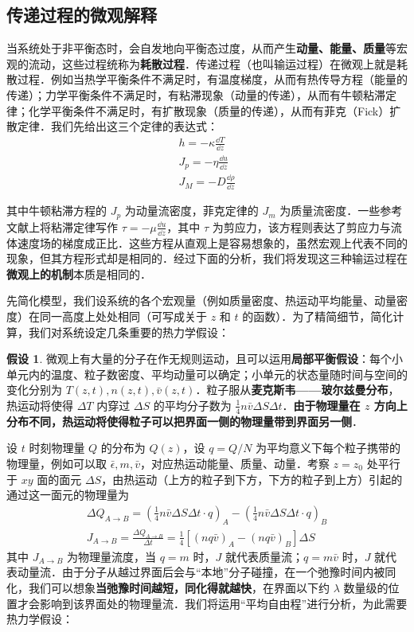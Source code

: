 \subsection{传递过程的微观解释}
当系统处于非平衡态时，会自发地向平衡态过度，从而产生\textbf{动量、能量、质量}等宏观的流动，这些过程统称为\textbf{耗散过程}．传递过程（也叫输运过程）在微观上就是耗散过程．例如当热学平衡条件不满足时，有温度梯度，从而有热传导方程（能量的传递）；力学平衡条件不满足时，有粘滞现象（动量的传递），从而有牛顿粘滞定律；化学平衡条件不满足时，有扩散现象（质量的传递），从而有菲克（Fick）扩散定律．我们先给出这三个定律的表达式：
\begin{align}
h=-\kappa \frac{\dd T}{\dd z}\\
J_p=-\eta \frac{\dd u}{\dd z}\\
J_M=-D\frac{\dd \rho}{\dd z}
\end{align}

其中牛顿粘滞方程的 $J_p$ 为动量流密度，菲克定律的 $J_m$ 为质量流密度．一些参考文献上将粘滞定律写作 $\tau = -\mu \frac{\dd u}{\dd z}$，其中 $\tau$ 为剪应力，该方程则表达了剪应力与流体速度场的梯度成正比．这些方程从直观上是容易想象的，虽然宏观上代表不同的现象，但其方程形式却是相同的．经过下面的分析，我们将发现这三种输运过程在\textbf{微观上的机制}本质是相同的．

先简化模型，我们设系统的各个宏观量（例如质量密度、热运动平均能量、动量密度）在同一高度上处处相同（可写成关于 $z$ 和 $t$ 的函数）．为了精简细节，简化计算，我们对系统设定几条重要的热力学假设：

\textbf{假设 1}. 微观上有大量的分子在作无规则运动，且可以运用\textbf{局部平衡假设}：每个小单元内的温度、粒子数密度、平均动量可以确定；小单元的状态量随时间与空间的变化分别为 $T(z,t),n(z,t),\bar v(z,t)$．粒子服从\textbf{麦克斯韦——玻尔兹曼分布}，热运动将使得 $\Delta T$ 内穿过 $\Delta S$ 的平均分子数为 $\frac{1}{4}n\bar v \Delta S\Delta t$．\textbf{由于物理量在 $z$ 方向上分布不同，热运动将使得粒子可以把界面一侧的物理量带到界面另一侧}．

设 $t$ 时刻物理量 $Q$ 的分布为 $Q(z)$，设 $q=Q/N$ 为平均意义下每个粒子携带的物理量，例如可以取 $\bar \epsilon,m,\bar v$，对应热运动能量、质量、动量．考察 $z=z_0$ 处平行于 $xy$ 面的面元 $\Delta S$，由热运动（上方的粒子到下方，下方的粒子到上方）引起的通过这一面元的物理量为
\begin{align}
\Delta Q_{A\rightarrow B}=(\frac{1}{4}n\bar v \Delta S\Delta t\cdot q)_A-(\frac{1}{4}n\bar v \Delta S\Delta t\cdot q)_B
\\
J_{A\rightarrow B}=\frac{\Delta Q_{A\rightarrow B}}{\Delta t}=\frac{1}{4}[(nq\bar v)_A-(nq\bar v)_B]\Delta S
\end{align}
其中 $J_{A\rightarrow B}$ 为物理量流度，当 $q=m$ 时，$J$ 就代表质量流；$q=m\bar v$ 时，$J$ 就代表动量流．由于分子从越过界面后会与“本地”分子碰撞，在一个弛豫时间内被同化，我们可以想象\textbf{当弛豫时间越短，同化得就越快}，在界面以下约 $\lambda$ 数量级的位置才会影响到该界面处的物理量流．我们将运用“平均自由程”进行分析，为此需要热力学假设：

